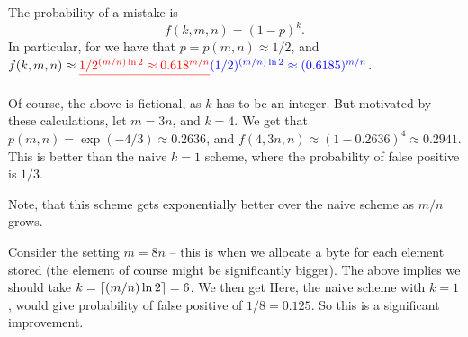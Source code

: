 The probability of a mistake is
\begin{equation*}
    f(k,m,n) = (1-p)^k.
\end{equation*}
In particular, for  we have that
$p = p(m,n) \approx 1/2$, and
$f(k,m,n) \approx \chgY{1/2^{(m/n)\ln 2} \approx 0.618^{m/n}}{(1/2)^{(m/n)\ln 2} \approx (0.6185)^{m/n}}$.

\begin{example}
    Of course, the above is fictional, as $k$ has to be an
    integer. But motivated by these calculations, let $m=3n$, and
    $k=4$.  We get that $p(m,n) = \exp( -4/3) \approx 0.2636$, and
    $f( 4,3n,n) \approx (1-0.2636)^4 \approx 0.2941$. This is
    better than the naive $k=1$ scheme, where the probability of false
    positive is $1/3$.    
\end{example}

Note, that this scheme gets exponentially better over the naive scheme
as $m/n$ grows.

\begin{example}
    Consider the setting $m=8n$ -- this is when we allocate a byte for
    each element stored (the element of course might be significantly
    bigger). The above implies we should take
    $k =\left\lceil { (m/n)\ln 2} \right\rceil = 6$. We then get
     Here, the naive scheme with $k=1$,
    would give probability of false positive of $1/8 =0.125$. So this
    is a significant improvement.
\end{example}

